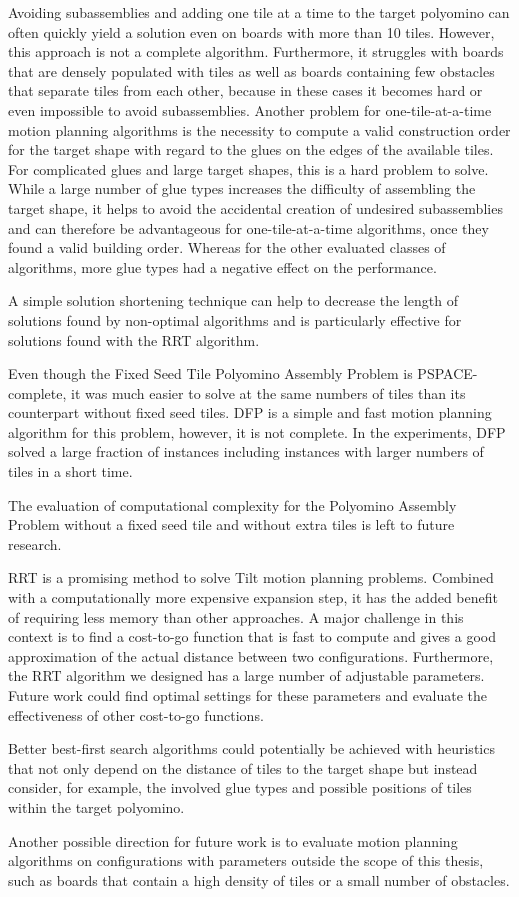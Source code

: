 Avoiding subassemblies and adding one tile at a time to the target polyomino can often quickly yield a solution even on boards with more than 10 tiles. However, this approach is not a complete algorithm. Furthermore, it struggles with boards that are densely populated with tiles as well as boards containing few obstacles that separate tiles from each other, because in these cases it becomes hard or even impossible to avoid subassemblies. Another problem for one-tile-at-a-time motion planning algorithms is the necessity to compute a valid construction order for the target shape with regard to the glues on the edges of the available tiles. For complicated glues and large target shapes, this is a hard problem to solve. While a large number of glue types increases the difficulty of assembling the target shape, it helps to avoid the accidental creation of undesired subassemblies and can therefore be advantageous for one-tile-at-a-time algorithms, once they found a valid building order. Whereas for the other evaluated classes of algorithms, more glue types had a negative effect on the performance. \par
A simple solution shortening technique can help to decrease the length of solutions found by non-optimal algorithms and is particularly effective for solutions found with the RRT algorithm. \par
Even though the Fixed Seed Tile Polyomino Assembly Problem is PSPACE-complete, it was much easier to solve at the same numbers of tiles than its counterpart without fixed seed tiles. DFP is a simple and fast motion planning algorithm for this problem, however, it is not complete. In the experiments, DFP solved a large fraction of instances including instances with larger numbers of tiles in a short time. \par
The evaluation of computational complexity for the Polyomino Assembly Problem without a fixed seed tile and without extra tiles is left to future research. \par
RRT is a promising method to solve Tilt motion planning problems. Combined with a computationally more expensive expansion step, it has the added benefit of requiring less memory than other approaches. A major challenge in this context is to find a cost-to-go function that is fast to compute and gives a good approximation of the actual distance between two configurations. Furthermore, the RRT algorithm we designed has a large number of adjustable parameters. Future work could find optimal settings for these parameters and evaluate the effectiveness of other cost-to-go functions. \par
Better best-first search algorithms could potentially be achieved with heuristics that not only depend on the distance of tiles to the target shape but instead consider, for example, the involved glue types and possible positions of tiles within the target polyomino. \par
Another possible direction for future work is to evaluate motion planning algorithms on configurations with parameters outside the scope of this thesis, such as boards that contain a high density of tiles or a small number of obstacles.